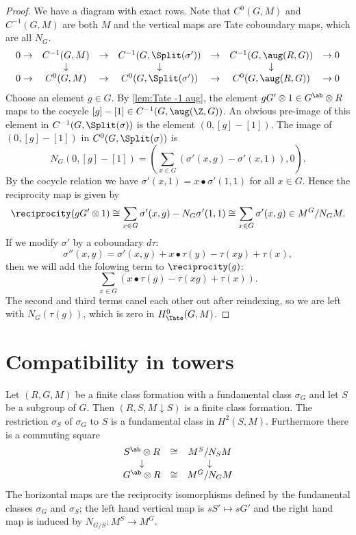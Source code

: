 \begin{proof}
	We have a diagram with exact rows.
	Note that $C^0(G,M)$ and $C^{-1}(G,M)$ are both $M$
	and the vertical maps are Tate coboundary maps,
	which are all $N_G$.
	\[
		\begin{matrix}
			0 \to & C^{-1}(G,M) & \to & C^{-1}(G,\Split(\sigma')) & \to & C^{-1}(G,\aug(R,G)) & \to 0 \\
			&\downarrow &&\downarrow &&\downarrow \\
			0 \to & C^{0}(G,M) & \to & C^{0}(G,\Split(\sigma')) & \to & C^{0}(G,\aug(R,G)) & \to 0
		\end{matrix}
	\]
	Choose an element $g \in G$. By \ref{lem:Tate -1 aug},
	the element $gG' \otimes 1 \in G^{\ab} \otimes R$ maps to the cocycle
	$[g]-[1] \in C^{-1}(G,\aug(\Z,G))$.
	An obvious pre-image of this element in $C^{-1}(G,\Split(\sigma))$ is
	the element $(0,[g]-[1])$.
	The image of $(0,[g]-[1])$ in $C^{0}(G,\Split(\sigma))$ is
	\[
		N_G(0,[g]-[1])
		=
		\left(\sum_{x \in G} (\sigma'(x,g) - \sigma'(x,1)), 0\right).
	\]
	By the cocycle relation we have $\sigma'(x,1) = x \bullet \sigma'(1,1)$ for all $x\in G$.
	Hence the reciprocity map is given by
	\[
		\reciprocity(gG' \otimes 1)
		\cong \sum_{x \in G} \sigma'(x,g) - N_G \sigma'(1,1)
		\cong \sum_{x \in G} \sigma'(x,g)
		\in M^G / N_G M.
	\]
	If we modify $\sigma'$ by a coboundary $d\tau$:
	\[
		\sigma''(x,y) = \sigma'(x,y) + x \bullet \tau(y) - \tau(xy) + \tau(x),
	\]
	then we will add the folowing term to $\reciprocity(g)$:
	\[
		\sum_{x \in G} (x \bullet \tau(g) - \tau(xg) + \tau(x)).
	\]
	The second and third terms canel each other out after reindexing, so we are
	left with $N_G(\tau(g))$, which is zero in $H^0_{\Tate}(G,M)$.
\end{proof}






\section{Compatibility in towers}

\begin{lemma} \label{lem:subgroup compatibility}
	Let $(R,G,M)$ be a finite class formation with a fundamental class $\sigma_G$
	and let $S$ be a subgroup of $G$.
	Then $(R, S, M \downarrow S)$ is a finite class formation. The restriction $\sigma_S$ of $\sigma_G$
	to $S$ is a fundamental class in $H^2(S,M)$.
	Furthermore there is a commuting square
	\[
		\begin{matrix}
			S^{\ab} \otimes R & \cong & M^S / N_SM \\
			\downarrow && \downarrow \\
			G^{\ab} \otimes R & \cong & M^G / N_GM
		\end{matrix}
	\]
	The horizontal maps are the reciprocity isomorphisms defined by the fundamental classes
	$\sigma_G$ and $\sigma_S$; the left hand vertical map is $sS' \mapsto sG'$ and the right hand map
	is induced by $N_{G/S} :M^S \to M^G$.
\end{lemma}


